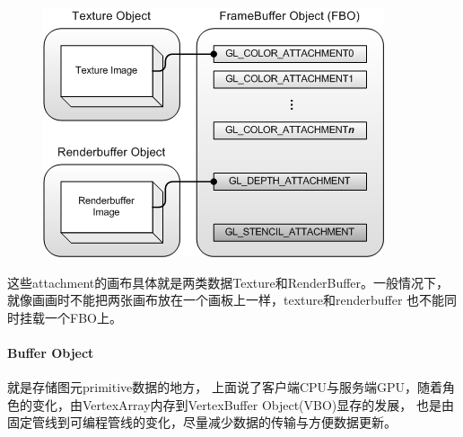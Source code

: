 \begin{figure}[h]
    \centering
    \includegraphics[width=\textwidth]{images/gl_fbo.png}
\end{figure}

这些attachment的画布具体就是两类数据Texture和RenderBuffer。一般情况下，就像画画时不能把两张画布放在一个画板上一样，texture和renderbuffer
也不能同时挂载一个FBO上。

\paragraph{Buffer Object}

就是存储图元primitive数据的地方， 上面说了客户端CPU与服务端GPU，随着角色的变化，由VertexArray内存到VertexBuffer Object(VBO)显存的发展，
也是由固定管线到可编程管线的变化，尽量减少数据的传输与方便数据更新。

